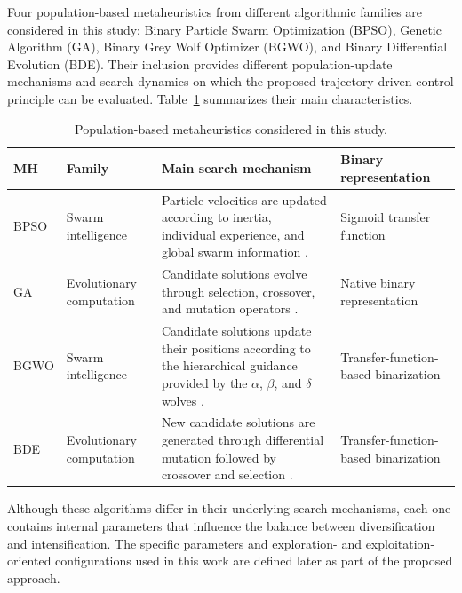\documentclass[journal,article,submit,moreauthors]{Definitions/mdpi}
\begin{document}
Four population-based metaheuristics from different algorithmic families are
considered in this study: Binary Particle Swarm Optimization (BPSO), Genetic
Algorithm (GA), Binary Grey Wolf Optimizer (BGWO), and Binary Differential
Evolution (BDE). Their inclusion provides different population-update
mechanisms and search dynamics on which the proposed trajectory-driven control
principle can be evaluated. Table~\ref{tab:mhs} summarizes their main
characteristics.

\begin{table}[htbp]
\centering
\caption{Population-based metaheuristics considered in this study.}
\label{tab:mhs}
\begin{tabular}{@{}p{1.6cm} p{2.2cm} p{5.1cm} p{2.7cm}@{}}
\toprule
\textbf{MH} & \textbf{Family} & \textbf{Main search mechanism} &
\textbf{Binary representation} \\
\midrule

BPSO &
Swarm intelligence &
Particle velocities are updated according to inertia, individual experience,
and global swarm information \cite{kennedy1997discrete}. &
Sigmoid transfer function \\

\midrule

GA &
Evolutionary computation &
Candidate solutions evolve through selection, crossover, and mutation
operators \cite{holland1975adaptation,goldberg1989genetic}. &
Native binary representation \\

\midrule

BGWO &
Swarm intelligence &
Candidate solutions update their positions according to the hierarchical
guidance provided by the $\alpha$, $\beta$, and $\delta$ wolves
\cite{mirjalili2014grey,emary2016binary}. &
Transfer-function-based binarization \\

\midrule

BDE &
Evolutionary computation &
New candidate solutions are generated through differential mutation followed
by crossover and selection \cite{storn1997differential,pampara2006binary}. &
Transfer-function-based binarization \\

\bottomrule
\end{tabular}
\end{table}

Although these algorithms differ in their underlying search mechanisms, each
one contains internal parameters that influence the balance between
diversification and intensification. The specific parameters and
exploration- and exploitation-oriented configurations used in this work are
defined later as part of the proposed approach.
\end{document}
